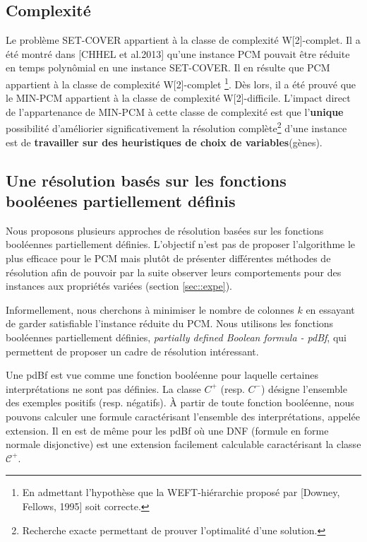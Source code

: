 \documentclass[a4paper,10pt]{article}
\begin{document}
\subsection{Complexité}
Le problème SET-COVER appartient à la classe de complexité W[2]-complet. Il a été montré dans [CHHEL et al.2013] qu'une instance PCM pouvait être réduite en temps polynômial en une instance SET-COVER. Il en résulte que PCM appartient à la classe de complexité W[2]-complet \footnote{En admettant l'hypothèse que la WEFT-hiérarchie proposé par [Downey, Fellows, 1995] soit correcte.}. Dès lors, il a été prouvé que le MIN-PCM appartient à la classe de complexité W[2]-difficile. L'impact direct de l'appartenance de MIN-PCM à cette classe de complexité est que l'\textbf{unique} possibilité d'améliorier significativement la résolution complète\footnote{Recherche exacte permettant de prouver l'optimalité d'une solution.} d'une instance est de \textbf{travailler sur des heuristiques de choix de variables}(gènes). 

\subsection{Une résolution basés sur les fonctions booléenes partiellement définis}
Nous proposons plusieurs approches de résolution basées sur les fonctions booléennes
partiellement définies. L'objectif n'est pas de proposer l'algorithme le plus efficace pour le PCM mais plutôt de présenter différentes méthodes de résolution afin de pouvoir par la suite observer leurs comportements pour des instances  aux propriétés variées (section \ref{sec::expe}).

Informellement, nous cherchons à minimiser le nombre de colonnes $k$ en essayant
de garder satisfiable l'instance réduite du PCM. Nous utilisons les fonctions booléennes partiellement définies, {\em partially
defined Boolean formula - pdBf},  \cite{Iba99} qui permettent de proposer un
cadre de résolution intéressant.

Une pdBf est vue comme une fonction booléenne pour laquelle  certaines interprétations ne
sont pas définies.
La classe ${C}^{+}$ (resp. ${C}^{-}$)  désigne l'ensemble des exemples positifs
(resp. négatifs).
À partir de toute fonction booléenne, nous pouvons calculer une formule
caractérisant l'ensemble des interprétations, appelée extension. Il en est de
même pour les pdBf où une DNF (formule en forme normale disjonctive) est une
extension facilement calculable caractérisant la classe $\mathcal{C}^+$.
\end{document}
